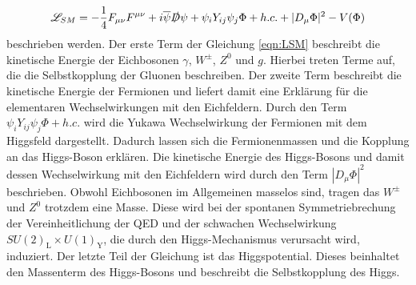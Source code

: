 \begin{equation}
  \mathscr{L}_{SM} = - \frac{1}{4}F_{\mu\nu}F^{\mu\nu} + i \overline{\psi}\slashed{D}\psi + \psi_i Y_{ij} \psi_j \Phi + h.c. + |D_{\mu}\Phi|^2 - V(\Phi)
  \label{eqn:LSM}
\end{equation}
beschrieben werden. Der erste Term der Gleichung \eqref{eqn:LSM} beschreibt die kinetische Energie der Eichbosonen $\gamma$, $W^{\pm}$, $Z^0$ und $g$.
Hierbei treten Terme auf, die die Selbstkopplung der Gluonen beschreiben. Der zweite Term beschreibt die kinetische Energie der Fermionen und liefert damit eine Erklärung für die elementaren Wechselwirkungen mit den Eichfeldern.
Durch den Term $\psi_i Y_{ij} \psi_j \Phi + h.c.$ wird die Yukawa Wechselwirkung der Fermionen mit dem Higgsfeld dargestellt.
Dadurch lassen sich die Fermionenmassen und die Kopplung an das Higgs-Boson erklären.
Die kinetische Energie des Higgs-Bosons und damit dessen
Wechselwirkung mit den Eichfeldern wird durch den Term $|D_{\mu}\Phi|^2$ beschrieben. Obwohl Eichbosonen im Allgemeinen masselos sind, tragen das $W^{\pm}$ und $Z^0$ trotzdem eine Masse. Diese wird bei der spontanen Symmetriebrechung der Vereinheitlichung der QED und der schwachen Wechselwirkung $SU(2)_\text{L} \times U(1)_\text{Y}$, die durch den Higgs-Mechanismus verursacht wird, induziert. Der letzte Teil der Gleichung ist das Higgspotential. Dieses beinhaltet den Massenterm des Higgs-Bosons und beschreibt die Selbstkopplung des Higgs.

